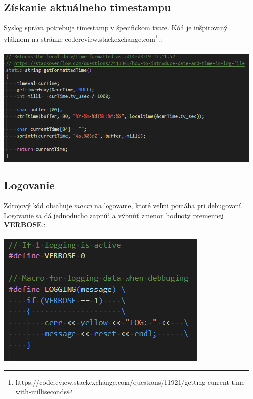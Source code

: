 \documentclass{article}
\begin{document}
        \newpage

        \subsection{Získanie aktuálneho timestampu}
        Syslog správa potrebuje timestamp v špecifickom tvare. Kód je inšpirovaný vláknom na stránke
        codereview.stackexchange.com\footnote{https://codereview.stackexchange.com/questions/11921/getting-current-time-with-milliseconds}.:\\\\
        \includegraphics[scale=0.6]{timestamp.png}

        \subsection{Logovanie}
        Zdrojový kód obsahuje \emph{macro} na logovanie, ktoré veľmi pomáha pri debugovaní. Logovanie sa dá jednoducho zapnúť a výpnúť zmenou hodnoty
        premennej \textbf{VERBOSE}.:\\\\
        \includegraphics[scale=0.6]{log.png}

        \newpage
\end{document}
